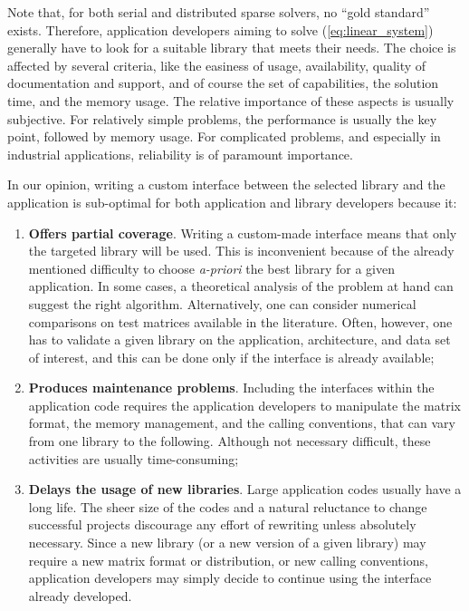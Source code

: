 \documentclass{llncs}
\begin{document}
\smallskip

Note that,
for both serial and distributed sparse solvers, no
``gold standard'' exists. Therefore, application developers aiming to solve
(\ref{eq:linear_system}) generally have to look for a suitable
library that meets their needs. The choice is affected by several criteria,
like the easiness of
usage, availability, quality of documentation and support, and of course
the set of capabilities, the solution time, and the memory usage.
The relative importance of these aspects is usually subjective. For
relatively simple problems, the performance is usually the key point, followed
by memory usage. For complicated problems, and especially in industrial
applications, reliability is of paramount importance.


In our opinion, writing a custom interface between the selected library and the application
is sub-optimal for both application and library developers because it:
\begin{enumerate}

\item
{\bf Offers partial coverage}. Writing a custom-made interface means
that only the targeted library will be used. This is inconvenient
because of the already mentioned difficulty to choose {\it a-priori}
the best library for a given application. In some cases, a
theoretical analysis of the problem at hand can suggest the right
algorithm. Alternatively, one can consider numerical comparisons on
test matrices available in the literature.
Often, however, one has to validate a given library on the
application, architecture, and data set of interest, and this can be
done only if the interface is already available;

\item
{\bf Produces maintenance problems}. Including the interfaces within
the application code requires the application developers to
manipulate the matrix format, the memory management, and the calling
conventions, that can vary from one library to the
following. Although not necessary difficult, these activities are
usually time-consuming;

\item
{\bf Delays the usage of new libraries}. Large application codes
usually have a long life.  The sheer size of the codes and a natural
reluctance to change successful projects discourage any effort of
rewriting unless absolutely necessary. Since a new library (or a new
version of a given library) may require a new matrix format or
distribution, or new calling conventions, application developers may
simply decide to continue using the interface already developed.
\end{enumerate}
\end{document}
